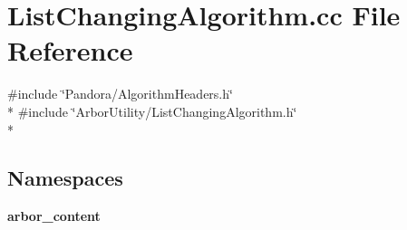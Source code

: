 \section{List\+Changing\+Algorithm.\+cc File Reference}
\label{ListChangingAlgorithm_8cc}
{\ttfamily \#include \char`\"{}Pandora/\+Algorithm\+Headers.\+h\char`\"{}}\\*
{\ttfamily \#include \char`\"{}Arbor\+Utility/\+List\+Changing\+Algorithm.\+h\char`\"{}}\\*
\subsection*{Namespaces}
\begin{DoxyCompactItemize}
\item 
 {\bf arbor\+\_\+content}
\end{DoxyCompactItemize}
